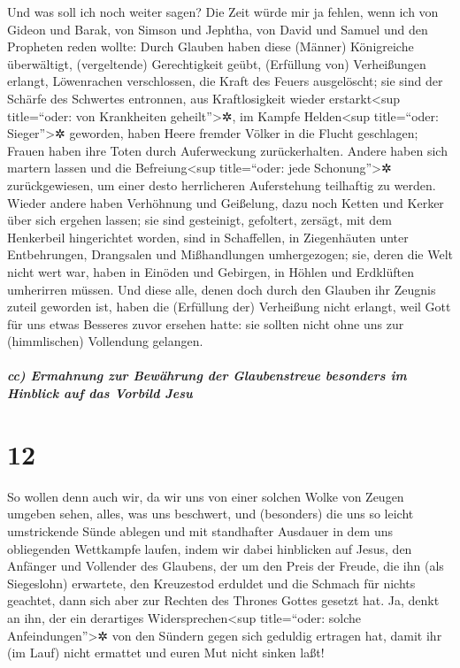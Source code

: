  Und was soll ich noch weiter sagen? Die Zeit würde mir
ja fehlen, wenn ich von Gideon und Barak, von Simson und Jephtha, von
David und Samuel und den Propheten reden wollte:  Durch
Glauben haben diese (Männer) Königreiche überwältigt, (vergeltende)
Gerechtigkeit geübt, (Erfüllung von) Verheißungen erlangt, Löwenrachen
verschlossen,  die Kraft des Feuers ausgelöscht; sie sind
der Schärfe des Schwertes entronnen, aus Kraftlosigkeit wieder
erstarkt\textless sup title=``oder: von Krankheiten
geheilt''\textgreater✲, im Kampfe Helden\textless sup title=``oder:
Sieger''\textgreater✲ geworden, haben Heere fremder Völker in die Flucht
geschlagen;  Frauen haben ihre Toten durch Auferweckung
zurückerhalten. Andere haben sich martern lassen und die
Befreiung\textless sup title=``oder: jede Schonung''\textgreater✲
zurückgewiesen, um einer desto herrlicheren Auferstehung teilhaftig zu
werden.  Wieder andere haben Verhöhnung und Geißelung,
dazu noch Ketten und Kerker über sich ergehen lassen; 
sie sind gesteinigt, gefoltert, zersägt, mit dem Henkerbeil hingerichtet
worden, sind in Schaffellen, in Ziegenhäuten unter Entbehrungen,
Drangsalen und Mißhandlungen umhergezogen;  sie, deren
die Welt nicht wert war, haben in Einöden und Gebirgen, in Höhlen und
Erdklüften umherirren müssen.  Und diese alle, denen doch
durch den Glauben ihr Zeugnis zuteil geworden ist, haben die (Erfüllung
der) Verheißung nicht erlangt,  weil Gott für uns etwas
Besseres zuvor ersehen hatte: sie sollten nicht ohne uns zur
(himmlischen) Vollendung gelangen.

\hypertarget{cc-ermahnung-zur-bewuxe4hrung-der-glaubenstreue-besonders-im-hinblick-auf-das-vorbild-jesu}{%
\subparagraph{cc) Ermahnung zur Bewährung der Glaubenstreue besonders im
Hinblick auf das Vorbild
Jesu}\label{cc-ermahnung-zur-bewuxe4hrung-der-glaubenstreue-besonders-im-hinblick-auf-das-vorbild-jesu}}

\hypertarget{section-11}{%
\section{12}\label{section-11}}

 So wollen denn auch wir, da wir uns von einer solchen
Wolke von Zeugen umgeben sehen, alles, was uns beschwert, und
(besonders) die uns so leicht umstrickende Sünde ablegen und mit
standhafter Ausdauer in dem uns obliegenden Wettkampfe laufen,
 indem wir dabei hinblicken auf Jesus, den Anfänger und
Vollender des Glaubens, der um den Preis der Freude, die ihn (als
Siegeslohn) erwartete, den Kreuzestod erduldet und die Schmach für
nichts geachtet, dann sich aber zur Rechten des Thrones Gottes gesetzt
hat.  Ja, denkt an ihn, der ein derartiges
Widersprechen\textless sup title=``oder: solche
Anfeindungen''\textgreater✲ von den Sündern gegen sich geduldig ertragen
hat, damit ihr (im Lauf) nicht ermattet und euren Mut nicht sinken laßt!

